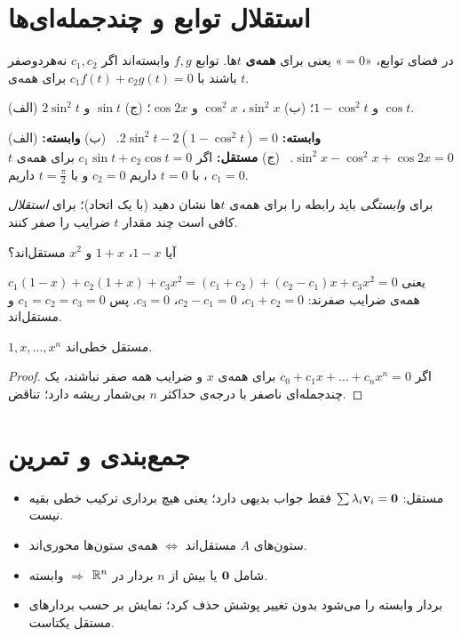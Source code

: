 \section{استقلال توابع و چندجمله‌ای‌ها}

در فضای توابع، «$=0$» یعنی برای \textbf{همه‌ی} $t$ها. توابع $f,g$ وابسته‌اند اگر $c_1,c_2$ نه‌هر‌دو‌صفر باشند با $c_1f(t)+c_2g(t)=0$ برای همه‌ی $t$.

\begin{example}
(الف) $2\sin^2t$ و $1-\cos^2t$؛ (ب) $\sin^2x$، $\cos^2x$ و $\cos2x$؛ (ج) $\sin t$ و $\cos t$.
\end{example}
\begin{solution}
(الف) \textbf{وابسته:} $2\sin^2t-2(1-\cos^2t)=0$. \
(ب) \textbf{وابسته:} $\sin^2x-\cos^2x+\cos2x=0$. \
(ج) \textbf{مستقل:} اگر $c_1\sin t+c_2\cos t=0$ برای همه‌ی $t$، با $t=0$ داریم $c_2=0$ و با $t=\frac\pi2$ داریم $c_1=0$.
\end{solution}

\begin{warning}
برای \emph{وابستگی} باید رابطه را برای همه‌ی $t$ها نشان دهید (با یک اتحاد)؛ برای \emph{استقلال} کافی است چند مقدار $t$ ضرایب را صفر کنند.
\end{warning}

\begin{example}
آیا $1-x$، $1+x$ و $x^2$ مستقل‌اند؟
\end{example}
\begin{solution}
$c_1(1-x)+c_2(1+x)+c_3x^2=(c_1+c_2)+(c_2-c_1)x+c_3x^2=0$ یعنی همه‌ی ضرایب صفرند: $c_1+c_2=0$، $c_2-c_1=0$، $c_3=0$. پس $c_1=c_2=c_3=0$ و مستقل‌اند.
\end{solution}

\begin{theorem}\label{thm:monomials-indep}
$1,x,\dots,x^n$ مستقل خطی‌اند.
\end{theorem}
\begin{proof}
اگر $c_0+c_1x+\dots+c_nx^n=0$ برای همه‌ی $x$ و ضرایب همه صفر نباشند، یک چندجمله‌ای ناصفر با درجه‌ی حداکثر $n$ بی‌شمار ریشه دارد؛ تناقض.
\end{proof}

\section{جمع‌بندی و تمرین}

\begin{summary}
\begin{itemize}
  \item مستقل: $\sum\lambda_i\mathbf{v}_i=\mathbf{0}$ فقط جواب بدیهی دارد؛ یعنی هیچ برداری ترکیب خطی بقیه نیست.
  \item ستون‌های $A$ مستقل‌اند $\iff$ همه‌ی ستون‌ها محوری‌اند.
  \item شامل $\mathbf{0}$ یا بیش از $n$ بردار در $\mathbb{R}^n$ $\Rightarrow$ وابسته.
  \item بردار وابسته را می‌شود بدون تغییر پوشش حذف کرد؛ نمایش بر حسب بردارهای مستقل یکتاست.
\end{itemize}
\end{summary}

